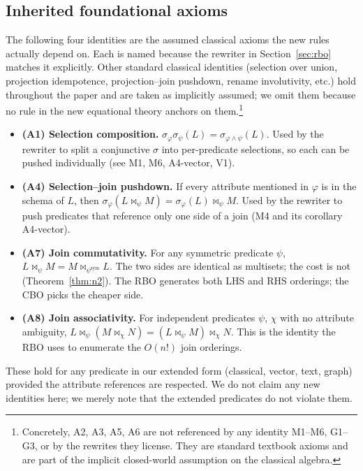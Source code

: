 \documentclass[sigconf]{acmart}
\theoremstyle{plain}
\theoremstyle{definition}
\theoremstyle{remark}
\begin{document}
\subsection{Inherited foundational axioms}\label{sec:equational:inherited}

The following four identities are the assumed classical axioms the
new rules actually depend on. Each is named because the
rewriter in Section~\ref{sec:rbo} matches it explicitly. Other
standard classical identities (selection over union, projection
idempotence, projection--join pushdown, rename involutivity, etc.)
hold throughout the paper and are taken as implicitly assumed; we
omit them because no rule in the new equational theory anchors on
them.\footnote{Concretely, A2, A3, A5, A6 are not referenced by any
identity M1--M6, G1--G3, or by the rewrites they license. They are
standard textbook axioms and are part of the implicit closed-world
assumption on the classical algebra.}

\begin{itemize}[leftmargin=*]
  \item \textbf{(A1) Selection composition.}
    $\sigma_\varphi \sigma_\psi(L) = \sigma_{\varphi \wedge \psi}(L)$.
    Used by the rewriter to split a conjunctive $\sigma$ into
    per-predicate selections, so each can be pushed individually
    (see M1, M6, A4-vector, V1).
  \item \textbf{(A4) Selection--join pushdown.} If every attribute
    mentioned in $\varphi$ is in the schema of $L$, then
    $\sigma_\varphi(L \bowtie_\psi M) = \sigma_\varphi(L) \bowtie_\psi M$.
    Used by the rewriter to push predicates that reference only one
    side of a join (M4 and its corollary A4-vector).
  \item \textbf{(A7) Join commutativity.} For any symmetric
    predicate $\psi$, $L \bowtie_\psi M = M \bowtie_{\psi^{\mathrm{sym}}} L$.
    The two sides are identical as multisets; the cost is not
    (Theorem~\ref{thm:n2}). The RBO generates both LHS and RHS
    orderings; the CBO picks the cheaper side.
  \item \textbf{(A8) Join associativity.} For independent
    predicates $\psi$, $\chi$ with no attribute ambiguity,
    $L \bowtie_\psi (M \bowtie_\chi N) = (L \bowtie_\psi M) \bowtie_\chi N$.
    This is the identity the RBO uses to enumerate the $O(n!)$
    join orderings.
\end{itemize}

These hold for any predicate in our extended form (classical,
vector, text, graph) provided the attribute references are
respected. We do not claim any new identities here; we merely
note that the extended predicates do not violate them.
\end{document}
